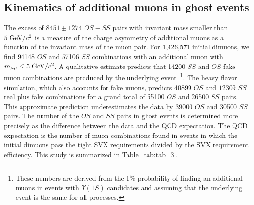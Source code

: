 \documentclass[aps,prd,preprint,floatfix,nofootinbib,superscriptaddress,showpacs,amssymb]{revtex4}
\begin{document}
\subsection{Kinematics of additional muons in ghost events}
\label{sec:ss-addkin}
 The excess of $8451 \pm 1274$ $OS-SS$ pairs with invariant mass smaller
 than $ 5\; {\rm GeV/}c^2$ is a measure of the charge asymmetry of additional
 muons as a function of the invariant mass of the muon pair. For
 1,426,571 initial dimuons, we find 94148 $OS$ and 57106 $SS$ combinations
 with an additional muon with $m_{\mu\mu} \leq 5 \; {\rm GeV/}c^2$. A qualitative
 estimate predicts that 14200 $SS$ and $OS$ fake muon combinations are
 produced by the underlying event~\footnote{
 These numbers are derived from the 1\% probability of finding an
 additional muons in events with $\Upsilon(1S)$ candidates and assuming
 that the underlying event is the same for all processes.}.
 The heavy flavor simulation, which also accounts for fake muons, predicts
 40899 $OS$ and $12309$ $SS$ real plus fake combinations for a grand total
 of 55100 $OS$ and 26500 $SS$ pairs. This approximate prediction 
 underestimates the data by 39000 $OS$ and 30500 $SS$ pairs. The number
 of the $OS$ and $SS$ pairs in ghost events is determined more precisely
 as the difference between the data and the QCD expectation. The QCD
 expectation is the number of muon combinations found in events in which
 the initial dimuons pass the tight SVX requirements divided by the SVX
 requirement efficiency. This study is summarized in Table~\ref{tab:tab_3}.
\end{document}
